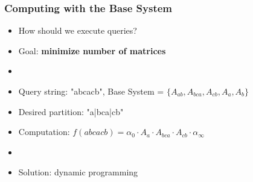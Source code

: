 \documentclass{beamer}
\begin{document}

\begin{frame}
\frametitle{Computing with the Base System}
\begin{itemize}


\item How should we execute queries?
\item[] Goal: \textbf{minimize number of matrices}
\item[]

\item[] Query string: "abcacb", Base System = $\{A_{ab}, A_{bca}, A_{cb}, A_a, A_b \}$ 


\item[] Desired partition: "a|bca|cb"
\item[] Computation: $f(abcacb)=\alpha_0 \cdot A_a \cdot A_{bca} \cdot A_{cb} \cdot \alpha_\infty$ 
\item[]

\item Solution: dynamic programming


\end{itemize}
\end{frame}

\end{document}
